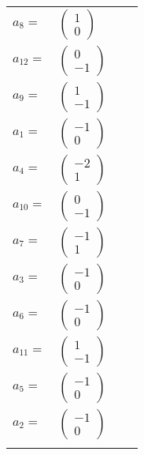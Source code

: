 \documentclass[1p]{elsarticle_modified}
\theoremstyle{definition}
\begin{document}
\begin{tabular}{m{7pt} m{180pt} m{7pt} m{180pt} }
\flushright $a_{8}=$&$\begin{pmatrix}1\\0\end{pmatrix}$ \\
\flushright $a_{12}=$&$\begin{pmatrix}0\\-1\end{pmatrix}$ \\
\flushright $a_{9}=$&$\begin{pmatrix}1\\-1\end{pmatrix}$ \\
\flushright $a_{1}=$&$\begin{pmatrix}-1\\0\end{pmatrix}$ \\
\flushright $a_{4}=$&$\begin{pmatrix}-2\\1\end{pmatrix}$ \\
\flushright $a_{10}=$&$\begin{pmatrix}0\\-1\end{pmatrix}$ \\
\flushright $a_{7}=$&$\begin{pmatrix}-1\\1\end{pmatrix}$ \\
\flushright $a_{3}=$&$\begin{pmatrix}-1\\0\end{pmatrix}$ \\
\flushright $a_{6}=$&$\begin{pmatrix}-1\\0\end{pmatrix}$ \\
\flushright $a_{11}=$&$\begin{pmatrix}1\\-1\end{pmatrix}$ \\
\flushright $a_{5}=$&$\begin{pmatrix}-1\\0\end{pmatrix}$ \\
\flushright $a_{2}=$&$\begin{pmatrix}-1\\0\end{pmatrix}$\\&\end{tabular}
\end{document}
